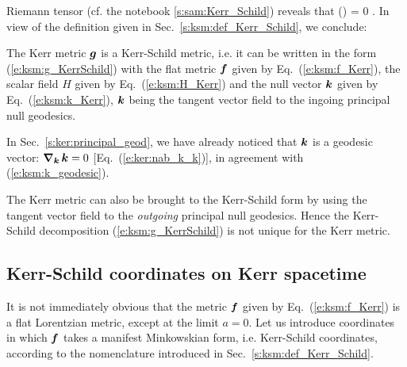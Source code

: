 Riemann tensor (cf. the notebook \ref{s:sam:Kerr_Schild}) reveals that
\be
    () = 0 .
\ee
In view of the definition given in Sec.~\ref{s:ksm:def_Kerr_Schild},
we conclude:
\begin{prop}
The Kerr metric $\bm{g}$ is a Kerr-Schild metric, i.e. it can be written in
the form (\ref{e:ksm:g_KerrSchild}) with the flat metric
$\bm{f}$ given by Eq.~(\ref{e:ksm:f_Kerr}), the scalar field $H$ given
by Eq.~(\ref{e:ksm:H_Kerr}) and the null vector $\bm{k}$ given by
Eq.~(\ref{e:ksm:k_Kerr}), $\bm{k}$ being the tangent vector field to
the ingoing principal null geodesics.
\end{prop}
In Sec.~\ref{s:ker:principal_geod},
we have already noticed that $\bm{k}$ is a geodesic vector:
$\bm{\nabla}_{\bm{k}}\, \bm{k} = 0$ [Eq.~(\ref{e:ker:nab_k_k})], in agreement with
(\ref{e:ksm:k_geodesic}).

\begin{remark}
The Kerr metric can also be brought to the Kerr-Schild form by using the
tangent vector field to the  \emph{outgoing} principal null geodesics. Hence
the Kerr-Schild decomposition (\ref{e:ksm:g_KerrSchild}) is not unique for
the Kerr metric.
\end{remark}

\subsection{Kerr-Schild coordinates on Kerr spacetime}

It is not immediately obvious that the metric $\bm{f}$ given by
Eq.~(\ref{e:ksm:f_Kerr}) is a flat Lorentzian metric, except at the limit $a=0$.
Let us introduce coordinates in which $\bm{f}$ takes a manifest Minkowskian
form, i.e. Kerr-Schild coordinates, according to the nomenclature introduced
in Sec.~\ref{s:ksm:def_Kerr_Schild}.

